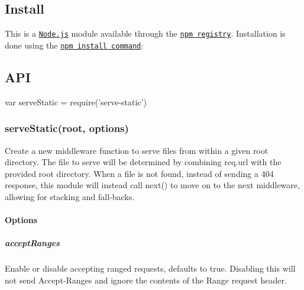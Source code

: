 \href{https://npmjs.org/package/serve-static}{\tt } \href{https://npmjs.org/package/serve-static}{\tt } \href{https://travis-ci.org/expressjs/serve-static}{\tt } \href{https://ci.appveyor.com/project/dougwilson/serve-static}{\tt } \href{https://coveralls.io/r/expressjs/serve-static}{\tt }

\subsection*{Install}

This is a \href{https://nodejs.org/en/}{\tt Node.\+js} module available through the \href{https://www.npmjs.com/}{\tt npm registry}. Installation is done using the \href{https://docs.npmjs.com/getting-started/installing-npm-packages-locally}{\tt {\ttfamily npm install} command}\+:




\subsection*{A\+PI}


\begin{DoxyCode}
var serveStatic = require('serve-static')
\end{DoxyCode}


\subsubsection*{serve\+Static(root, options)}

Create a new middleware function to serve files from within a given root directory. The file to serve will be determined by combining {\ttfamily req.\+url} with the provided root directory. When a file is not found, instead of sending a 404 response, this module will instead call {\ttfamily next()} to move on to the next middleware, allowing for stacking and fall-\/backs.

\paragraph*{Options}

\subparagraph*{accept\+Ranges}

Enable or disable accepting ranged requests, defaults to true. Disabling this will not send {\ttfamily Accept-\/\+Ranges} and ignore the contents of the {\ttfamily Range} request header.

